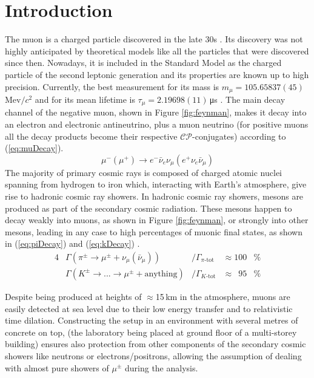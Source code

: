 \documentclass[../main.tex]{subfiles}
\begin{document}
\section{Introduction}
\label{sec:intro}
The muon is a charged particle discovered in the late 30s \cite{street1937new}. Its discovery was not highly anticipated by theoretical models like all the particles that were discovered since then. Nowadays, it is included in the Standard Model as the charged particle of the second leptonic generation and its properties are known up to  high precision. Currently, the best measurement for its mass is \mbox{$m_\mu=105.65837(45)$\,Mev$/c^2$} and for its mean lifetime is \mbox{$\tau_\mu=2.19698(11)$\,\unit{\micro \second}} \cite{Workman2022ynf}. The main decay channel of the negative muon, shown in Figure \ref{fig:feynman}, makes it decay into an electron and electronic antineutrino, plus a muon neutrino (for positive muons all the decay products become their respective $\mathcal{CP}$-conjugates) according to (\ref{eq:muDecay}).
\begin{equation}
    \mu^- (\mu^+)\to e^-  \bar{\nu}_e \nu_\mu (e^+  \nu_e \bar{\nu}_\mu)
    \label{eq:muDecay}
\end{equation}
The majority of primary cosmic rays is composed of charged atomic nuclei spanning from hydrogen to iron which, interacting with Earth's atmosphere, give rise to hadronic cosmic ray showers. In hadronic cosmic ray showers, mesons are produced as part of the secondary cosmic radiation. These mesons happen to decay weakly into muons, as shown in Figure \ref{fig:feynman}, or strongly into other mesons, leading in any case to high percentages of muonic final states, as shown in (\ref{eq:piDecay}) and (\ref{eq:kDecay}) \cite{Workman2022ynf}.
\begin{alignat}{4}
    &\Gamma(\pi^\pm \to \mu^\pm + \nu_\mu(\bar{\nu}_\mu))&/ \Gamma_{\pi \text{-tot}}&\approx100&\% \label{eq:piDecay}\\
    &\Gamma(K^\pm \to ... \to \mu^\pm + \text{anything})&/ \Gamma_{K\text{-tot}}&\approx \phantom{1}95&\% \label{eq:kDecay}
\end{alignat}

Despite being produced at heights of $\approx$15\,km in the atmosphere, muons are easily detected at sea level due to their low energy transfer and to relativistic time dilation. Constructing the setup in an environment with several metres of concrete on top, (the laboratory being placed at ground floor of a multi-storey building) ensures also protection from other components of the secondary cosmic showers like neutrons or electrons/positrons, allowing the assumption of dealing with almost pure showers of $\mu^\pm$ during the analysis.\\
\end{document}
